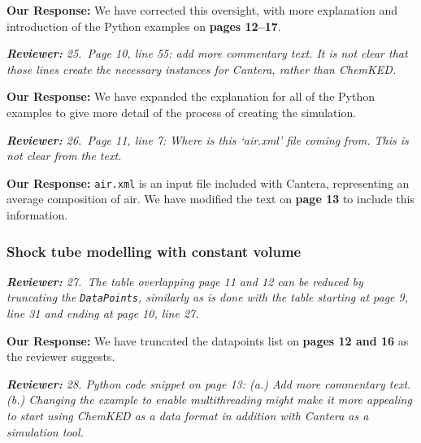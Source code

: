 \documentclass[a4paper,10pt]{elsarticle}
\newenvironment{reviewer}{\vspace{0.5\baselineskip}\begingroup\itshape\textbf{Reviewer:}}{\endgroup}
\newenvironment{response}{\textbf{Our Response:}}{\vspace{0.5\baselineskip}}
\begin{document}
\begin{response}
    We have corrected this oversight, with more explanation and introduction of the Python
    examples on \textbf{pages 12--17}.
\end{response}

\begin{reviewer}
    25.~Page 10, line 55: add more commentary text. It is not clear that those lines create the
    necessary instances for Cantera, rather than ChemKED.
\end{reviewer}

\begin{response}
    We have expanded the explanation for all of the Python examples to give more detail of the
    process of creating the simulation.
\end{response}

\begin{reviewer}
    26.~Page 11, line 7: Where is this `air.xml' file coming from. This is not clear from the text.
\end{reviewer}

\begin{response}
    \verb|air.xml| is an input file included with Cantera, representing an average composition of
    air. We have modified the text on \textbf{page 13} to include this information.
\end{response}

\subsubsection*{Shock tube modelling with constant volume}

\begin{reviewer}
    27.~The table overlapping page 11 and 12 can be reduced by truncating the \texttt{DataPoints},
    similarly as is done with the table starting at page 9, line 31 and ending at page 10, line 27.
\end{reviewer}

\begin{response}
    We have truncated the datapoints list on \textbf{pages 12 and 16} as the reviewer suggests.
\end{response}

\begin{reviewer}
    28. Python code snippet on page 13: (a.) Add more commentary text. (b.) Changing the example to
    enable multithreading might make it more appealing to start using ChemKED as a data format in
    addition with Cantera as a simulation tool.
\end{reviewer}
\end{document}
